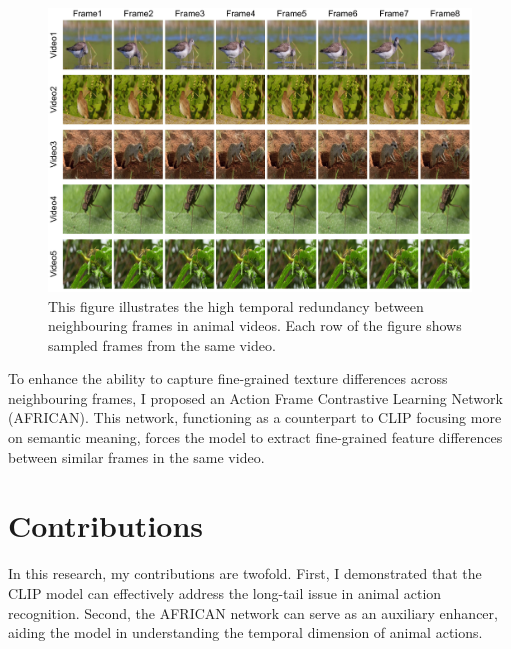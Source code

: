 \begin{figure}[h]
    \centering
    \includegraphics[width=1\textwidth]{assets/imgs/1_2_FrameComparison}
    \caption[Temporal Redundancy]{This figure illustrates the high temporal redundancy between neighbouring frames in animal videos. Each row of the figure shows sampled frames from the same video.}
    \label{fig:1_2_FrameComparison}
\end{figure}

To enhance the ability to capture fine-grained texture differences across neighbouring frames, I proposed an Action Frame Contrastive Learning Network (AFRICAN). This network, functioning as a counterpart to CLIP focusing more on semantic meaning, forces the model to extract fine-grained feature differences between similar frames in the same video. 

\section{Contributions}
In this research, my contributions are twofold. First, I demonstrated that the CLIP model can effectively address the long-tail issue in animal action recognition. Second, the AFRICAN network can serve as an auxiliary enhancer, aiding the model in understanding the temporal dimension of animal actions.






